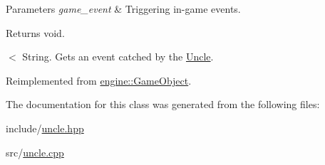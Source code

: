 \begin{DoxyParams}{Parameters}
{\em game\+\_\+event} & Triggering in-\/game events. \\
\hline
\end{DoxyParams}
\begin{DoxyReturn}{Returns}
void. 
\end{DoxyReturn}
$<$ String. Gets an event catched by the \hyperlink{classmindscape_1_1_uncle}{Uncle}. 

Reimplemented from \hyperlink{classengine_1_1_game_object}{engine\+::\+Game\+Object}.



The documentation for this class was generated from the following files\+:\begin{DoxyCompactItemize}
\item 
include/\hyperlink{uncle_8hpp}{uncle.\+hpp}\item 
src/\hyperlink{uncle_8cpp}{uncle.\+cpp}\end{DoxyCompactItemize}
